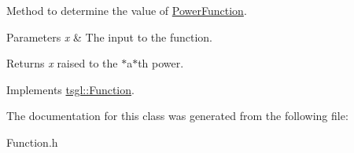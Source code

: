 Method to determine the value of \hyperlink{classtsgl_1_1_power_function}{Power\+Function}. 


\begin{DoxyParams}{Parameters}
{\em x} & The input to the function. \\
\hline
\end{DoxyParams}
\begin{DoxyReturn}{Returns}
{\itshape x} raised to the $\ast$a$\ast$th power. 
\end{DoxyReturn}


Implements \hyperlink{classtsgl_1_1_function_affb7b3b19a04efefa29a9870d666e912}{tsgl\+::\+Function}.



The documentation for this class was generated from the following file\+:\begin{DoxyCompactItemize}
\item 
Function.\+h\end{DoxyCompactItemize}
